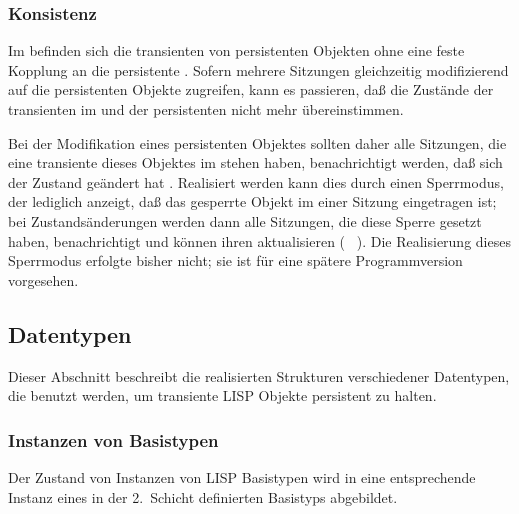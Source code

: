 \subsubsection{Konsistenz}%
\label{sec:plcon}
%
Im \cache\/ befinden sich die transienten \representations{} von
persistenten Objekten ohne eine feste Kopplung an die persistente
\representation. Sofern mehrere Sitzungen gleichzeitig modifizierend
auf die persistenten Objekte zugreifen, kann es passieren, da\ss{} die
Zust\"{a}nde der transienten \representation{} im \cache\/ und der
persistenten \representation{} nicht mehr \"{u}ber\-ein\-stim\-men.
%
\par{}Bei der Modifikation eines persistenten Objektes sollten daher
alle Sitzungen, die eine transiente \representation{} dieses Objektes im
\cache\/ stehen haben, benachrichtigt werden, da\ss{} sich der Zustand
ge\-\"{a}n\-dert hat \cite[]{bib:ro87}. Realisiert werden
kann dies durch einen Sperrmodus, der lediglich anzeigt, da\ss{} das
gesperrte Objekt im \cache\/ einer Sitzung eingetragen ist; bei
Zustands\"{a}nderungen werden dann alle Sitzungen, die diese Sperre
gesetzt haben, benachrichtigt und k\"{o}n\-nen ihren
\cache\/ aktualisieren
(\ %
\cite[]{bib:fe89}). Die Realisierung dieses 
Sperrmodus erfolgte bisher nicht; sie ist f\"{u}r eine sp\"{a}tere
Programmversion vorgesehen.
%
\subsection{Datentypen}
%
Dieser Abschnitt beschreibt die realisierten Strukturen verschiedener
Datentypen, die benutzt werden, um transiente LISP Objekte persistent
zu halten.
%
\subsubsection{Instanzen von Basistypen}
%
Der Zustand von Instanzen von LISP Basistypen wird in eine
entsprechende Instanz eines in der 2.~Schicht definierten Basistyps
abgebildet.
%
